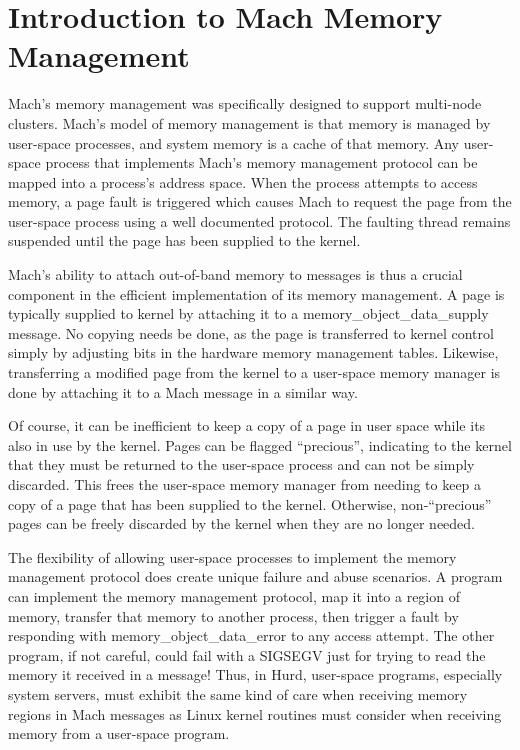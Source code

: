 \documentclass{article}
\begin{document}
\section{Introduction to Mach Memory Management}

Mach's memory management was specifically designed to support
multi-node clusters.  Mach's model of memory management is that memory
is managed by user-space processes, and system memory is a cache of
that memory.  Any user-space process that implements Mach's memory
management protocol can be mapped into a process's address space.
When the process attempts to access memory, a page fault is triggered
which causes Mach to request the page from the user-space process
using a well documented protocol.  The faulting thread remains
suspended until the page has been supplied to the kernel.

Mach's ability to attach out-of-band memory to messages is thus a
crucial component in the efficient implementation of its memory
management.  A page is typically supplied to kernel by attaching it to
a memory_object_data_supply message.  No copying needs be done, as the
page is transferred to kernel control simply by adjusting bits in the
hardware memory management tables.  Likewise, transferring a modified
page from the kernel to a user-space memory manager is done by
attaching it to a Mach message in a similar way.

Of course, it can be inefficient to keep a copy of a page in user
space while its also in use by the kernel.  Pages can be flagged
``precious'', indicating to the kernel that they must be returned to
the user-space process and can not be simply discarded.  This frees
the user-space memory manager from needing to keep a copy of a page
that has been supplied to the kernel.  Otherwise, non-``precious''
pages can be freely discarded by the kernel when they are no longer
needed.

The flexibility of allowing user-space processes to implement the
memory management protocol does create unique failure and abuse
scenarios.  A program can implement the memory management protocol,
map it into a region of memory, transfer that memory to another
process, then trigger a fault by responding with
memory_object_data_error to any access attempt.  The other program, if
not careful, could fail with a SIGSEGV just for trying to read the
memory it received in a message!  Thus, in Hurd, user-space programs,
especially system servers, must exhibit the same kind of care when
receiving memory regions in Mach messages as Linux kernel routines
must consider when receiving memory from a user-space program.
\end{document}
